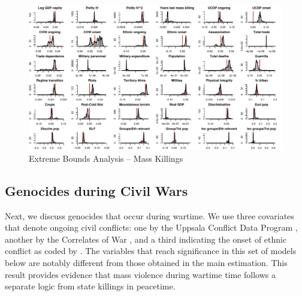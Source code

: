 \documentclass[a4paper,12pt]{article}
\begin{document}
\begin{figure}[H]
    \centering
    \includegraphics[width=.98\textheight,angle=90]{images/mk.pdf}
    \caption{Extreme Bounds Analysis -- Mass Killings}
    \label{fig:mk}
\end{figure}

\subsection{Genocides during Civil Wars}
\label{sec:civil-wars}

Next, we discuss genocides that occur during wartime. We use three covariates that denote ongoing civil conflicts: one by the Uppsala Conflict Data Program \citep{allansson2017organized,gleditsch2002armed}, another by the Correlates of War \citep{sarkees2010resort}, and a third indicating the onset of ethnic conflict as coded by \citet{cederman2010ethnic}. The variables that reach significance in this set of models below are notably different from those obtained in the main estimation. This result provides evidence that mass violence during wartime time follows a separate logic from state killings in peacetime.

\vspace{1cm}
\end{document}
